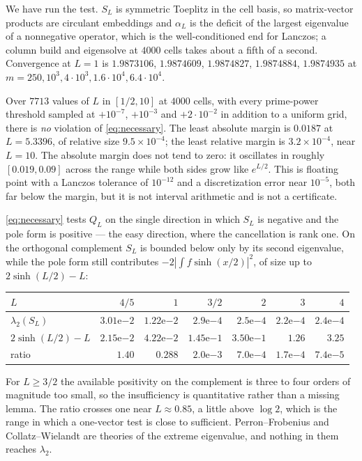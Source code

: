 We have run the test. $S_L$ is symmetric Toeplitz in the cell basis, so
matrix-vector products are circulant embeddings and $\alpha_L$ is the deficit of
the largest eigenvalue of a nonnegative operator, which is the well-conditioned
end for Lanczos; a column build and eigensolve at $4000$ cells takes about a
fifth of a second. Convergence at $L=1$ is
$1.9873106$, $1.9874609$, $1.9874827$, $1.9874884$, $1.9874935$ at
$m=250,10^3,4\cdot10^3,1.6\cdot10^4,6.4\cdot10^4$.

\begin{remark}\label{rem:scan}
Over $7713$ values of $L$ in $[1/2,10]$ at $4000$ cells, with every prime-power
threshold sampled at $+10^{-7}$, $+10^{-3}$ and $+2\cdot10^{-2}$ in addition to a
uniform grid, there is \emph{no} violation of \eqref{eq:necessary}. The least
absolute margin is $0.0187$ at $L=5.3396$, of relative size $9.5\times10^{-4}$;
the least relative margin is $3.2\times10^{-4}$, near $L=10$. The absolute margin
does not tend to zero: it oscillates in roughly $[0.019,0.09]$ across the range
while both sides grow like $e^{L/2}$. This is floating point with a Lanczos
tolerance of $10^{-12}$ and a discretization error near $10^{-5}$, both far below
the margin, but it is not interval arithmetic and is not a certificate.
\end{remark}

\begin{remark}\label{rem:insufficient}
\eqref{eq:necessary} tests $Q_L$ on the single direction in which $S_L$ is
negative and the pole form is positive --- the easy direction, where the
cancellation is rank one. On the orthogonal complement $S_L$ is bounded below
only by its second eigenvalue, while the pole form still contributes
$-2|\int f\sinh(x/2)|^2$, of size up to $2\sinh(L/2)-L$:
\begin{center}
\small
\begin{tabular}{lrrrrrr}
\toprule
$L$ & $4/5$ & $1$ & $3/2$ & $2$ & $3$ & $4$\\
\midrule
$\lambda_2(S_L)$ & $3.01$e$-2$ & $1.22$e$-2$ & $2.9$e$-4$ & $2.5$e$-4$ & $2.2$e$-4$ & $2.4$e$-4$\\
$2\sinh(L/2)-L$ & $2.15$e$-2$ & $4.22$e$-2$ & $1.45$e$-1$ & $3.50$e$-1$ & $1.26$ & $3.25$\\
ratio & $1.40$ & $0.288$ & $2.0$e$-3$ & $7.0$e$-4$ & $1.7$e$-4$ & $7.4$e$-5$\\
\bottomrule
\end{tabular}
\end{center}
For $L\geq3/2$ the available positivity on the complement is three to four
orders of magnitude too small, so the insufficiency is quantitative rather than
a missing lemma. The ratio crosses one near $L\approx0.85$, a little above
$\log2$, which is the range in which a one-vector test is close to sufficient.
Perron--Frobenius and Collatz--Wielandt are theories of the extreme eigenvalue,
and nothing in them reaches $\lambda_2$.
\end{remark}

